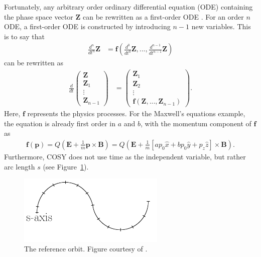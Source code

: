 Fortunately, any arbitrary order ordinary differential equation (ODE) containing the phase space vector $\mathbf{Z}$ can be rewritten as a first-order ODE \cite{modernMapMethods}. For an order $n$ ODE, a first-order ODE is constructed by introducing $n-1$ new variables. This is to say that
\begin{align} \nonumber
\frac{d^n}{dt^n}\mathbf{Z}&=\mathbf{f}\left(\frac{d^0}{dt^0}\mathbf{Z},...,\frac{d^{n-1}}{dt^{n-1}}\mathbf{Z}\right)
\end{align}
can be rewritten as
\begin{align} \nonumber
\frac{d}{dt} \begin{pmatrix}
		\mathbf{Z} \\ \mathbf{Z}_1 \\ \vdots \\ \mathbf{Z}_{n-1}
		\end{pmatrix}
&= 		\begin{pmatrix}
		\mathbf{Z}_1 \\ \mathbf{Z}_2 \\ \vdots \\ \mathbf{f}(\mathbf{Z},...,\mathbf{Z}_{n-1})
		\end{pmatrix}.
\end{align}
Here, $\mathbf{f}$ represents the physics processes. For the Maxwell's equations example, the equation is already first order in $a$ and $b$, with the momentum component of $\mathbf{f}$ as
\begin{align}\nonumber
\mathbf{f}(\mathbf{p})=Q(\mathbf{E}+\frac{1}{m}\mathbf{p}\times\mathbf{B})=Q(\mathbf{E}+\frac{1}{m}\left[ap_0 \hat{x} + bp_0\hat{y} + p_z \hat{z}\right]\times\mathbf{B}).
\end{align}
 Furthermore, COSY does not use time as the independent variable, but rather arc length $s$ (see Figure~\ref{fig:saxis}).

\begin{figure}[h!]
\centering
\includegraphics*[width=70mm]{./Figures/saxis}
\caption[The reference orbit.]{The reference orbit. Figure courtesy of \cite{berzFullnotes}.}
\label{fig:saxis}
\end{figure}

